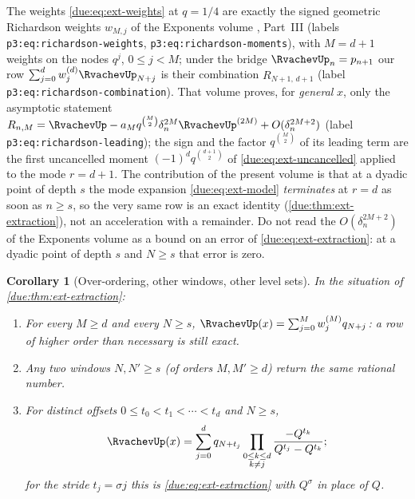 \documentclass[11pt,oneside]{article}
\theoremstyle{plain}
\newtheorem{corollary}[theorem]{Corollary}
\theoremstyle{definition}
\theoremstyle{remark}
\newcommand{\upn}[1]{\RvachevUp_{#1}}
\newcommand{\Qq}{Q}                                         %
\newcommand{\am}[1]{a_{#1}}                                 %
\newcommand{\qn}[1]{q_{#1}}                                 %
\newcommand{\Wrow}[2]{w^{(#1)}_{#2}}                        %
\begin{document}
\begin{warningbox}[title={Exact, not asymptotic: the same row as in the Exponents volume}]
The weights \cref{due:eq:ext-weights} at $q=1/4$ are exactly the signed
geometric Richardson weights $w_{M,j}$ of the Exponents volume
\cite{proveit-exponents}, Part~III (labels \texttt{p3:eq:richardson-\allowbreak weights},
\texttt{p3:eq:richardson-\allowbreak moments}), with $M=d+1$ weights on the nodes
$q^{j}$, $0\le j<M$; under the bridge $\upn{n}=p_{n+1}$ our row
$\sum_{j=0}^{d}\Wrow{d}{j}\upn{N+j}$ is their combination $R_{N+1,\,d+1}$
(label \texttt{p3:eq:richardson-\allowbreak combination}).  That volume proves, for
\emph{general} $x$, only the asymptotic statement
$R_{n,M}=\RvachevUp-\am{M}q^{\binom M2}\delta_{n}^{2M}\RvachevUp^{(2M)}
+O(\delta_{n}^{2M+2})$ (label \texttt{p3:eq:richardson-\allowbreak leading}); the sign
and the factor $q^{\binom{M}{2}}$ of its leading term are the first
uncancelled moment $(-1)^{d}q^{\binom{d+1}{2}}$ of
\cref{due:eq:ext-uncancelled} applied to the mode $r=d+1$.  The contribution
of the present volume is that at a dyadic point of depth $s$ the mode
expansion \cref{due:eq:ext-model} \emph{terminates} at $r=d$ as soon as
$n\ge s$, so the very same row is an exact identity
(\cref{due:thm:ext-extraction}), not an acceleration with a remainder.  Do
not read the $O(\delta_{n}^{2M+2})$ of the Exponents volume as a bound on an
error of \cref{due:eq:ext-extraction}: at a dyadic point of depth $s$ and
$N\ge s$ that error is zero.
\end{warningbox}

\begin{corollary}[Over-ordering, other windows, other level sets]
\label{due:cor:ext-overorder}
In the situation of \cref{due:thm:ext-extraction}:
\begin{enumerate}
\item For every $M\ge d$ and every $N\ge s$,
 $\RvachevUp(x)=\sum_{j=0}^{M}\Wrow{M}{j}\qn{N+j}$: a row of higher order
 than necessary is still exact.
\item Any two windows $N,N'\ge s$ (of orders $M,M'\ge d$) return the same
 rational number.
\item For distinct offsets $0\le t_{0}<t_{1}<\cdots<t_{d}$ and $N\ge s$,
 \begin{equation}
  \RvachevUp(x)
  =\sum_{j=0}^{d}\qn{N+t_{j}}
   \prod_{\substack{0\le k\le d\\k\neq j}}
   \frac{-\Qq^{t_{k}}}{\Qq^{t_{j}}-\Qq^{t_{k}}};
  \label{due:eq:ext-nonconsecutive}
 \end{equation}
 for the stride $t_{j}=\sigma j$ this is \cref{due:eq:ext-extraction} with
 $\Qq^{\sigma}$ in place of $\Qq$.
\end{enumerate}
\end{corollary}
\end{document}
